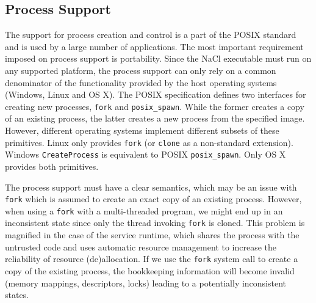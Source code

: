 

\subsection{Process Support}
\label{sub:process_support}

The support for process creation and control is a part of the POSIX
standard and is used by a large number of applications.  The most
important requirement imposed on process support is portability. Since
the NaCl executable must run on any supported platform, the process
support can only rely on a common denominator of the functionality
provided by the host operating systems (\ie Windows, Linux and OS X).
The POSIX specification defines two interfaces for creating new
processes, \lstinline`fork` and \lstinline`posix_spawn`.  While the
former creates a copy of an existing process, the latter creates a new
process from the specified image.  However, different operating systems
implement different subsets of these primitives. Linux only provides
\lstinline`fork` (or \lstinline`clone` as a non-standard extension).
Windows \lstinline`CreateProcess` is equivalent to POSIX
\lstinline`posix_spawn`. Only OS X provides both primitives.

The process support must have a clear semantics, which may be an issue
with \lstinline`fork` which is assumed to create an exact copy of
an existing process. However, when using a \lstinline`fork` with a
multi-threaded program, we might end up in an inconsistent state since
only the thread invoking \lstinline`fork` is cloned.  This problem is
magnified in the case of the service runtime, which shares the process
with the untrusted code and uses automatic resource management to
increase the reliability of resource (de)allocation. If we use the
\lstinline`fork` system call to create a copy of the existing process,
the bookkeeping information will become invalid (\eg memory mappings,
descriptors, locks) leading to a potentially inconsistent states.

